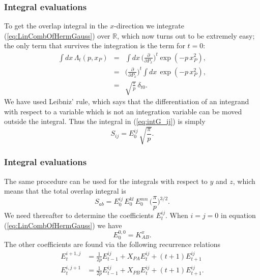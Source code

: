 \frame
{
  \frametitle{Integral evaluations}
\begin{small}
{\scriptsize
To get the overlap integral in the $x$-direction we integrate (\ref{eq:LinCombOfHermGauss}) over $\mathbb{R}$, which now turns out to be extremely easy;
the only term that survives the integration is the term for $t=0$:
\begin{eqnarray}
 \int dx\,\Lambda_t(p,x_P) & = & \int dx\,\Big(\frac{\partial}{\partial P_x}\Big)^t\exp(-p\,x^2_P), \\
                           & = & \Big(\frac{\partial}{\partial P_x}\Big)^t \int dx\,\exp(-p\,x^2_P), \\
                           & = & \sqrt{\frac{\pi}{p}}\,\delta_{t0}.
\end{eqnarray}
We have used Leibniz' rule, which says that the differentiation of an integrand with respect to a variable which is not an integration variable can
be moved outside the integral. Thus the integral in (\ref{eq:intG_ij}) is simply
\begin{equation}
 S_{ij} = E^{ij}_0\,\sqrt{\frac{\pi}{p}}.
\end{equation}

}
\end{small}
}
\frame
{
  \frametitle{Integral evaluations}
\begin{small}
{\scriptsize
The same procedure can be used for the integrals with respect to $y$ and $z$, which means that the total overlap integral is
\begin{equation}
 S_{ab} = E^{ij}_0\,E^{kl}_0\,E^{mn}_0\,\Big(\frac{\pi}{p}\Big)^{3/2}.
\end{equation}
We need thereafter to determine the coefficients $E^{ij}_t$. When $i=j=0$ in equation (\ref{eq:LinCombOfHermGauss})
we have
\begin{equation}
 E^{0,0}_0 = K_{AB}^x.
\end{equation}
The other coefficients are found via the following recurrence relations
\begin{equation}
\label{eq:E_recurrence}
\begin{split}
 E^{i+1,j}_t & = \frac{1}{2p}E^{ij}_{t-1} + X_{PA}E^{ij}_t + (t+1)E^{ij}_{t+1} \\
 E^{i,j+1}_t & = \frac{1}{2p}E^{ij}_{t-1} + X_{PB}E^{ij}_t + (t+1)E^{ij}_{t+1}.
\end{split}
\end{equation}
}
\end{small}
}
\frame
